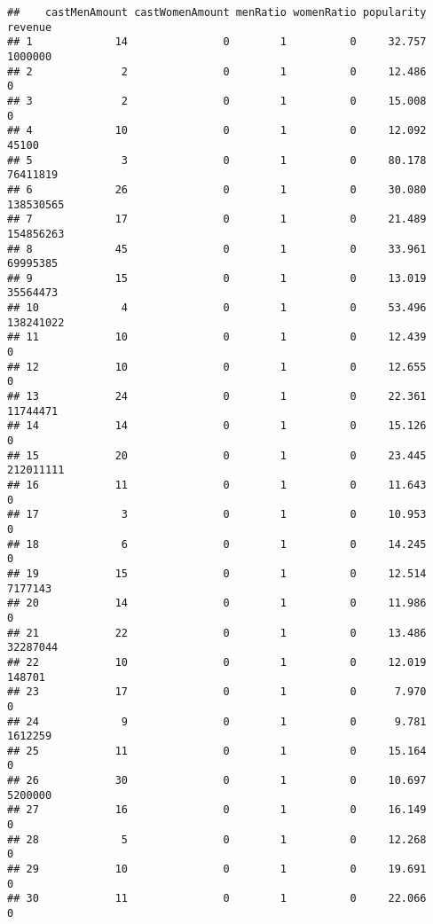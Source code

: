 \documentclass[
]{article}
\begin{document}
\begin{verbatim}
##    castMenAmount castWomenAmount menRatio womenRatio popularity   revenue
## 1             14               0        1          0     32.757   1000000
## 2              2               0        1          0     12.486         0
## 3              2               0        1          0     15.008         0
## 4             10               0        1          0     12.092     45100
## 5              3               0        1          0     80.178  76411819
## 6             26               0        1          0     30.080 138530565
## 7             17               0        1          0     21.489 154856263
## 8             45               0        1          0     33.961  69995385
## 9             15               0        1          0     13.019  35564473
## 10             4               0        1          0     53.496 138241022
## 11            10               0        1          0     12.439         0
## 12            10               0        1          0     12.655         0
## 13            24               0        1          0     22.361  11744471
## 14            14               0        1          0     15.126         0
## 15            20               0        1          0     23.445 212011111
## 16            11               0        1          0     11.643         0
## 17             3               0        1          0     10.953         0
## 18             6               0        1          0     14.245         0
## 19            15               0        1          0     12.514   7177143
## 20            14               0        1          0     11.986         0
## 21            22               0        1          0     13.486  32287044
## 22            10               0        1          0     12.019    148701
## 23            17               0        1          0      7.970         0
## 24             9               0        1          0      9.781   1612259
## 25            11               0        1          0     15.164         0
## 26            30               0        1          0     10.697   5200000
## 27            16               0        1          0     16.149         0
## 28             5               0        1          0     12.268         0
## 29            10               0        1          0     19.691         0
## 30            11               0        1          0     22.066         0
\end{verbatim}
\end{document}
